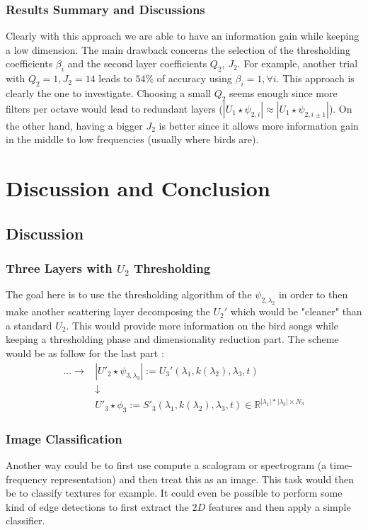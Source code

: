 \documentclass[a4paper]{report}
\begin{document}
\subsection{Results Summary and Discussions}
Clearly with this approach we are able to have an information gain while keeping a low dimension.
The main drawback concerns the selection of the thresholding coefficients $\beta_i$ and the second layer coefficients $Q_2$, $J_2$.
For example, another trial with $Q_2=1,J_2=14$ leads to $54\%$ of accuracy using $\beta_i=1,\forall i$. This approach is clearly the one to investigate. Choosing a small $Q_2$ seems enough since more filters per octave would lead to redundant layers ($|U_1 \star \psi_{2,i}| \approx |U_1 \star \psi_{2,i \pm 1 }|$). On the other hand, having a bigger $J_2$ is better since it allows more  information gain in the middle to low frequencies (usually where birds are). 
\chapter{Discussion and Conclusion}
\section{Discussion}
\subsection{Three Layers with $U_2$ Thresholding}
The goal here is to use the thresholding algorithm of the $\psi_{2,\lambda_2}$ in order to then make another scattering layer decomposing the $U_2'$ which would be "cleaner" than a standard $U_2$. This would provide more information on the bird songs while keeping a thresholding phase and dimensionality reduction part. The scheme would be as follow for the last part :
\begin{align*}
... \rightarrow & | U'_2 \star \psi_{3,\lambda_3}| :=U_3'(\lambda_1,k(\lambda_2),\lambda_3,t)\\
& \downarrow\\
& U'_3 \star \phi_3 := S'_3(\lambda_1, k(\lambda_2),\lambda_3,t) \in \mathbb{R}^{| \lambda_1 | * | \lambda_3| \times N_3}
\end{align*}
\subsection{Image Classification}
Another way could be to first use compute a scalogram or spectrogram (a time-frequency representation) and then treat this as an image. This task would then be to classify textures for example. It could even be possible to perform some kind of edge detections to first extract the $2D$ features and then apply a simple classifier. 
\end{document}
